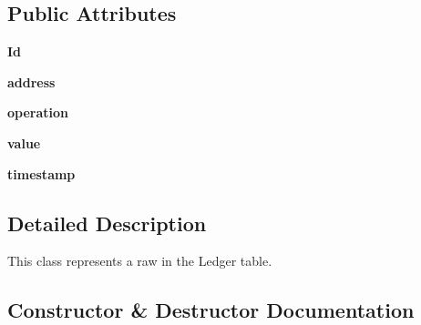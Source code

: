 \subsection*{Public Attributes}
\begin{DoxyCompactItemize}
\item 
\hypertarget{classclusterizer_1_1LedgerLine_1_1LedgerLine_ac35075dea79e1afd30ebafb1650f6d80}{}{\bfseries Id}\label{classclusterizer_1_1LedgerLine_1_1LedgerLine_ac35075dea79e1afd30ebafb1650f6d80}

\item 
\hypertarget{classclusterizer_1_1LedgerLine_1_1LedgerLine_a8eaef6bfedc42709bcc5816486c914a3}{}{\bfseries address}\label{classclusterizer_1_1LedgerLine_1_1LedgerLine_a8eaef6bfedc42709bcc5816486c914a3}

\item 
\hypertarget{classclusterizer_1_1LedgerLine_1_1LedgerLine_ac59896e714aebd7c6aef7f7958d10f3d}{}{\bfseries operation}\label{classclusterizer_1_1LedgerLine_1_1LedgerLine_ac59896e714aebd7c6aef7f7958d10f3d}

\item 
\hypertarget{classclusterizer_1_1LedgerLine_1_1LedgerLine_a6d648018c71e02c629d69cde646f020b}{}{\bfseries value}\label{classclusterizer_1_1LedgerLine_1_1LedgerLine_a6d648018c71e02c629d69cde646f020b}

\item 
\hypertarget{classclusterizer_1_1LedgerLine_1_1LedgerLine_a11b9bcb4141f3801bb4eec05a39843af}{}{\bfseries timestamp}\label{classclusterizer_1_1LedgerLine_1_1LedgerLine_a11b9bcb4141f3801bb4eec05a39843af}

\end{DoxyCompactItemize}


\subsection{Detailed Description}
\begin{DoxyVerb}This class represents a raw in the Ledger table.\end{DoxyVerb}
 

\subsection{Constructor \& Destructor Documentation}
\hypertarget{classclusterizer_1_1LedgerLine_1_1LedgerLine_a73464d06adbef7851dd5e6357366c4e3}{}
